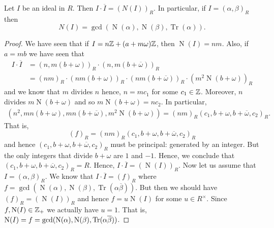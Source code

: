 
\begin{proposition}
    Let \(I\) be an ideal in \(R\).
    Then \(I \cdot \overline I = \left(N(I)\right)_R\).
    In particular, if $I = (\alpha, \beta)_R$ then
    \[
        N(I) =
        \gcd\left(
            \operatorname{N}(\alpha),
            \operatorname{N}(\beta),
            \operatorname{Tr}(\alpha)
        \right).
    \]
\end{proposition}

\begin{proof}
    We have seen that if $I = n \mathbb{Z} + (a + m \omega) \mathbb{Z}$, 
    then $\operatorname{N}(I) = nm$.
    Also, if $a = mb$ we have seen that
    \begin{align*}
        I \cdot \overline I
        &= \left(n, m(b + \omega)\right)_R \cdot
            \left( n, m(b + \overline\omega) \right)_R \\
        &= (nm)_R \cdot 
            \left( nm (b + \omega) \right)_R \cdot
            \left( nm(b + \overline\omega) \right)_R \cdot
            \left( m^2 \operatorname{N}(b + \omega) \right)_R
    \end{align*}
    and we know that $m$ divides $n$ hence, $n = m c_1$ for some $c_1 \in \mathbb{Z}$.
    Moreover, $n$ divides $m \operatorname{N}(b + \omega)$ and so
    $m \operatorname{N}(b + \omega) = nc_2$.
    In particular,
    \begin{align*}
        \left( n^2, mn(b + \omega), mn(b + \overline\omega), 
        m^2 \operatorname{N}(b + \omega) \right)
        = (nm)_R (c_1, b + \omega, b + \overline\omega, c_2)_R.
    \end{align*}
    That is,
    \[
        (f)_R = (nm)_R (c_1, b + \omega, b + \overline\omega, c_2)_R 
    \]
    and hence $(c_1, b + \omega, b + \overline\omega, c_2)_R$
    must be principal: generated by an integer.
    But the only integers that divide $b + \omega$ are $1$ and $-1$.
    Hence, we conclude that $(c_1, b + \omega, b + \overline\omega, c_2)_R = R$.
    Hence, 
    \(I \cdot \overline I = \left( \operatorname{N}(I) \right)_R\).
    Now let us assume that \(I = (\alpha, \beta)_R\).
    We know that \(I \cdot \overline I = (f)_R\) where
    \(
        f = \gcd\left(\operatorname{N}(\alpha),
                      \operatorname{N}(\beta),
                      \operatorname{Tr}(\alpha \overline\beta)
                \right)
    \).
    But then we should have \((f)_R = \left( \operatorname{N}(I) \right)_R\)
    and hence \(f = u \operatorname{N}(I)\) for some \(u \in R^\times\).
    Since \(f, \operatorname{N}(I) \in \mathbb{Z}_+\) we actually have \(u = 1\).
    That is, 
    \(
        \operatorname{N}(I) 
        = f 
        = \gcd(\operatorname{N}(\alpha), \operatorname{N}(\beta), \operatorname{Tr}(\alpha\overline\beta))
    \).
\end{proof}

